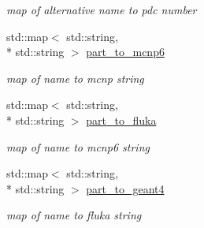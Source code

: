 \begin{DoxyCompactItemize}
\begin{DoxyCompactList}\small\item\em map of alternative name to pdc number \end{DoxyCompactList}\item 
\hypertarget{namespacepyne_1_1particle_a340aac212ae5cf8666cc47654c0889c4}{std\-::map$<$ std\-::string, \\*
std\-::string $>$ \hyperlink{namespacepyne_1_1particle_a340aac212ae5cf8666cc47654c0889c4}{part\-\_\-to\-\_\-mcnp6}}\label{namespacepyne_1_1particle_a340aac212ae5cf8666cc47654c0889c4}

\begin{DoxyCompactList}\small\item\em map of name to mcnp string \end{DoxyCompactList}\item 
\hypertarget{namespacepyne_1_1particle_a670bcdff7df3bec5a47da5a228ef41cf}{std\-::map$<$ std\-::string, \\*
std\-::string $>$ \hyperlink{namespacepyne_1_1particle_a670bcdff7df3bec5a47da5a228ef41cf}{part\-\_\-to\-\_\-fluka}}\label{namespacepyne_1_1particle_a670bcdff7df3bec5a47da5a228ef41cf}

\begin{DoxyCompactList}\small\item\em map of name to mcnp6 string \end{DoxyCompactList}\item 
\hypertarget{namespacepyne_1_1particle_a6032672d7a6469328b8df984e7383eab}{std\-::map$<$ std\-::string, \\*
std\-::string $>$ \hyperlink{namespacepyne_1_1particle_a6032672d7a6469328b8df984e7383eab}{part\-\_\-to\-\_\-geant4}}\label{namespacepyne_1_1particle_a6032672d7a6469328b8df984e7383eab}

\begin{DoxyCompactList}\small\item\em map of name to fluka string \end{DoxyCompactList}\end{DoxyCompactItemize}
